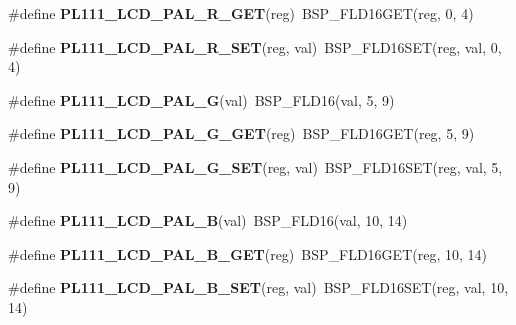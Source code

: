 \begin{DoxyCompactItemize}
\mbox{\label{arm-pl111-regs_8h_a23816e73945711af0c88791abe356a6e}} 
\#define {\bfseries P\+L111\+\_\+\+L\+C\+D\+\_\+\+P\+A\+L\+\_\+\+R\+\_\+\+G\+ET}(reg)~B\+S\+P\+\_\+\+F\+L\+D16\+G\+ET(reg, 0, 4)
\item 
\mbox{\label{arm-pl111-regs_8h_a48b549cd49c21e72be692ce7b2d872e2}} 
\#define {\bfseries P\+L111\+\_\+\+L\+C\+D\+\_\+\+P\+A\+L\+\_\+\+R\+\_\+\+S\+ET}(reg,  val)~B\+S\+P\+\_\+\+F\+L\+D16\+S\+ET(reg, val, 0, 4)
\item 
\mbox{\label{arm-pl111-regs_8h_a19fed72b72812d27cc6b6422c3bd275e}} 
\#define {\bfseries P\+L111\+\_\+\+L\+C\+D\+\_\+\+P\+A\+L\+\_\+G}(val)~B\+S\+P\+\_\+\+F\+L\+D16(val, 5, 9)
\item 
\mbox{\label{arm-pl111-regs_8h_a4344eb2654652d303579846d56740ab8}} 
\#define {\bfseries P\+L111\+\_\+\+L\+C\+D\+\_\+\+P\+A\+L\+\_\+\+G\+\_\+\+G\+ET}(reg)~B\+S\+P\+\_\+\+F\+L\+D16\+G\+ET(reg, 5, 9)
\item 
\mbox{\label{arm-pl111-regs_8h_ad3789e548d16c51b9bea986d76aaf346}} 
\#define {\bfseries P\+L111\+\_\+\+L\+C\+D\+\_\+\+P\+A\+L\+\_\+\+G\+\_\+\+S\+ET}(reg,  val)~B\+S\+P\+\_\+\+F\+L\+D16\+S\+ET(reg, val, 5, 9)
\item 
\mbox{\label{arm-pl111-regs_8h_a76664c65f645401ae41fa5d2af281096}} 
\#define {\bfseries P\+L111\+\_\+\+L\+C\+D\+\_\+\+P\+A\+L\+\_\+B}(val)~B\+S\+P\+\_\+\+F\+L\+D16(val, 10, 14)
\item 
\mbox{\label{arm-pl111-regs_8h_a43cf376ca0fc771d172e8ca42d4a5d21}} 
\#define {\bfseries P\+L111\+\_\+\+L\+C\+D\+\_\+\+P\+A\+L\+\_\+\+B\+\_\+\+G\+ET}(reg)~B\+S\+P\+\_\+\+F\+L\+D16\+G\+ET(reg, 10, 14)
\item 
\mbox{\label{arm-pl111-regs_8h_ad5015bb72757064ec4b1451ce87a0b47}} 
\#define {\bfseries P\+L111\+\_\+\+L\+C\+D\+\_\+\+P\+A\+L\+\_\+\+B\+\_\+\+S\+ET}(reg,  val)~B\+S\+P\+\_\+\+F\+L\+D16\+S\+ET(reg, val, 10, 14)
\item 
\mbox{\label{arm-pl111-regs_8h_a1ab898f4d235c260fd554286d462c4f0}} 

\end{DoxyCompactItemize}
